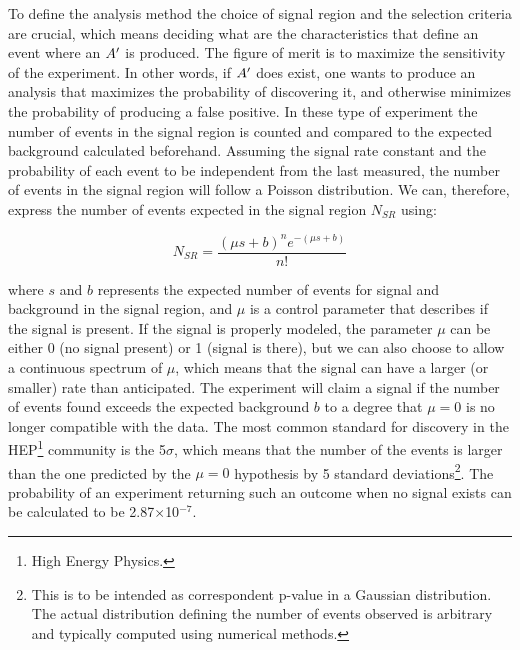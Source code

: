To define the analysis method the choice of signal region and the selection criteria are crucial, which means deciding what are the characteristics that define an event where an $A'$ is produced. The figure of merit is to maximize the sensitivity of the experiment. In other words, if $A'$ does exist, one wants to produce an analysis that maximizes the probability of discovering it, and otherwise minimizes the probability of producing a false positive. In these type of experiment the number of events in the signal region is counted and compared to the expected background calculated beforehand. Assuming the signal rate constant and the probability of each event to be independent from the last measured, the number of events in the signal region will follow a Poisson distribution. We can, therefore, express the number of events expected in the signal region $N_{SR}$ using:


\begin{equation}
  \label{eq:poisson-simple}
  N_{SR} = \frac{(\mu s + b)^ne^{-(\mu s + b)}}{n!}
\end{equation}

where $s$ and $b$ represents the expected number of events for signal and background in the signal region, and $\mu$ is a control parameter that describes if the signal is present. If the signal is properly modeled, the parameter $\mu$ can be either 0 (no signal present) or 1 (signal is there), but we can also choose to allow a continuous spectrum of $\mu$, which means that the signal can have a larger (or smaller) rate than anticipated. The experiment will claim a signal if the number of events found exceeds the expected background $b$ to a degree that $\mu = 0$ is no longer compatible with the data. The most common standard for discovery in the HEP\footnote{High Energy Physics.} community is the 5$\sigma$, which means that the number of the events is larger than the one predicted by the $\mu = 0$ hypothesis by 5 standard deviations\footnote{This is to be intended as correspondent p-value in a Gaussian distribution. The actual distribution defining the number of events observed is arbitrary and typically computed using numerical methods.}. The probability of an experiment returning such an outcome when no signal exists can be calculated to be 2.87$\times$10$^{-7}$.

